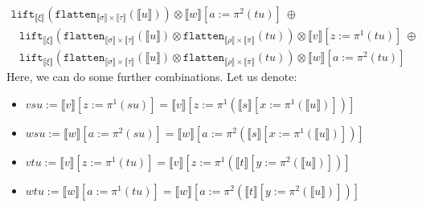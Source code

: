 \documentclass[a4paper,UKenglish,cleveref,autoref,numberwithinsect]{lipics-v2019}
\theoremstyle{definition}
\newcommand{\flatten}{\mathtt{flatten}}
\newcommand{\lift}{\mathtt{lift}}
\newcommand{\typeinterpret}[1]{\llbracket #1 \rrbracket}
\newcommand{\interpret}[1]{\llbracket #1 \rrbracket}
\begin{document}
\begin{itemize}
\[\begin{array}{l}
    \lift_{\typeinterpret{\xi}}(\flatten_{\typeinterpret{\sigma}
    \times \typeinterpret{\tau}}(\interpret{u})) \otimes
    \interpret{w}[a:=\pi^2(tu)]\ \oplus \\
  \phantom{A}
    \lift_{\typeinterpret{\xi}}(\flatten_{\typeinterpret{\sigma}
    \times \typeinterpret{\tau}}(\interpret{u}) \otimes
    \flatten_{\typeinterpret{\rho} \times
    \typeinterpret{\pi}}(tu)) \otimes \interpret{v}[z:=\pi^1(tu)]\
    \oplus \\
  \phantom{A}
    \lift_{\typeinterpret{\xi}}(\flatten_{\typeinterpret{\sigma}
    \times \typeinterpret{\tau}}(\interpret{u}) \otimes
    \flatten_{\typeinterpret{\rho}
    \times \typeinterpret{\pi}}(tu)) \otimes \interpret{w}[a:=\pi^2(tu)]
  \end{array}
  \]
  Here, we can do some further combinations.
  Let us denote:
  \begin{itemize}
  \item $vsu := \interpret{v}[z:=\pi^1(su)] =
    \interpret{v}[z:=\pi^1(\interpret{s}[x:=\pi^1(\interpret{u})])]$
  \item $wsu := \interpret{w}[a:=\pi^2(su)] =
    \interpret{w}[a:=\pi^2(\interpret{s}[x:=\pi^1(\interpret{u})])]$
  \item $vtu := \interpret{v}[z:=\pi^1(tu)] =
    \interpret{v}[z:=\pi^1(\interpret{t}[y:=\pi^2(\interpret{u})])]$
  \item $wtu := \interpret{w}[a:=\pi^1(tu)] =
    \interpret{w}[a:=\pi^2(\interpret{t}[y:=\pi^2(\interpret{u})])]$
  \end{itemize}


\end{itemize}
\end{document}
